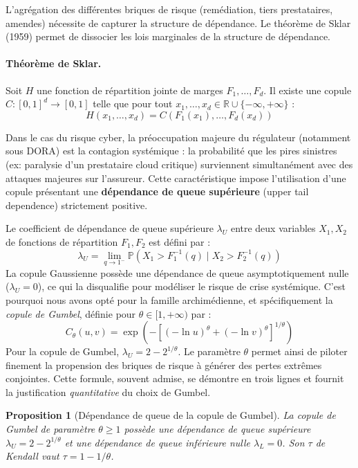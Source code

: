 \documentclass[11pt,a4paper]{article}
\theoremstyle{navystyle}
\newtheorem{proposition}[theorem]{Proposition}
\theoremstyle{navydef}
\begin{document}
L'agrégation des différentes briques de risque (remédiation, tiers prestataires, amendes) nécessite de capturer la structure de dépendance. Le théorème de Sklar (1959) permet de dissocier les lois marginales de la structure de dépendance.

\paragraph{Théorème de Sklar.} Soit $H$ une fonction de répartition jointe de marges $F_1, \dots, F_d$. Il existe une copule $C : [0,1]^d \to [0,1]$ telle que pour tout $x_1, \dots, x_d \in \mathbb{R} \cup \{-\infty, +\infty\}$ :
\begin{equation}
H(x_1, \dots, x_d) = C(F_1(x_1), \dots, F_d(x_d))
\end{equation}

Dans le cas du risque cyber, la préoccupation majeure du régulateur (notamment sous DORA) est la contagion systémique : la probabilité que les pires sinistres (ex: paralysie d'un prestataire cloud critique) surviennent simultanément avec des attaques majeures sur l'assureur. Cette caractéristique impose l'utilisation d'une copule présentant une \textbf{dépendance de queue supérieure} (upper tail dependence) strictement positive.

Le coefficient de dépendance de queue supérieure $\lambda_U$ entre deux variables $X_1, X_2$ de fonctions de répartition $F_1, F_2$ est défini par :
\begin{equation}
\lambda_U = \lim_{q \to 1^-} \mathbb{P}(X_1 > F_1^{-1}(q) \mid X_2 > F_2^{-1}(q))
\end{equation}
La copule Gaussienne possède une dépendance de queue asymptotiquement nulle ($\lambda_U = 0$), ce qui la disqualifie pour modéliser le risque de crise systémique. C'est pourquoi nous avons opté pour la famille archimédienne, et spécifiquement la \emph{copule de Gumbel}, définie pour $\theta \in [1, +\infty)$ par :
\begin{equation}
C_\theta(u, v) = \exp \left( - \left[ (-\ln u)^\theta + (-\ln v)^\theta \right]^{1/\theta} \right)
\end{equation}
Pour la copule de Gumbel, $\lambda_U = 2 - 2^{1/\theta}$. Le paramètre $\theta$ permet ainsi de piloter finement la propension des briques de risque à générer des pertes extrêmes conjointes. Cette formule, souvent admise, se démontre en trois lignes et fournit la justification \emph{quantitative} du choix de Gumbel.

\begin{proposition}[Dépendance de queue de la copule de Gumbel]\label{prop:gumbel}
La copule de Gumbel de paramètre $\theta\ge1$ possède une dépendance de queue supérieure $\lambda_U=2-2^{1/\theta}$ et une dépendance de queue inférieure nulle $\lambda_L=0$. Son $\tau$ de Kendall vaut $\tau=1-1/\theta$.
\end{proposition}
\end{document}
